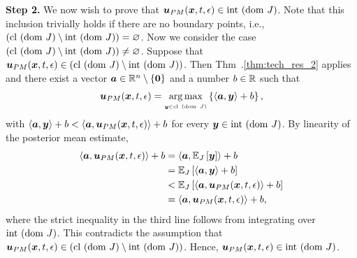 \textbf{Step 2.} We now wish to prove that $\boldsymbol{u}_{PM}(\boldsymbol{x},t,\epsilon) \in \mathrm{int~}(\mathrm{dom~} J)$. Note that this inclusion trivially holds if there are no boundary points, i.e., $
\left(\mathrm{cl~}(\mathrm{dom~} J) \setminus \mathrm{int~}(\mathrm{dom~} J)\right) = \varnothing$. Now we consider the case $\left(\mathrm{cl~}(\mathrm{dom~} J) \setminus \mathrm{int~}(\mathrm{dom~} J)\right) \neq \varnothing$. Suppose that $\boldsymbol{u}_{PM}(\boldsymbol{x},t,\epsilon) \in \left(\mathrm{cl~}(\mathrm{dom~} J) \setminus \mathrm{int~}(\mathrm{dom~} J)\right)$. Then Thm~.\ref{thm:tech_res_2} applies and there exist a vector $\boldsymbol{a}\in\mathbb{R}^n\setminus\{\boldsymbol{0}\}$ and a number $b\in\mathbb{R}$ such that 
\[
\boldsymbol{u}_{PM}(\boldsymbol{x},t,\epsilon)=\operatorname*{arg\,max}_{_{\boldsymbol{y}\in\mathrm{cl~}(\mathrm{dom~} J)}}\left\{\left\langle \boldsymbol{a},\boldsymbol{y}\right\rangle +b\right\},
\] 
with $\left\langle \boldsymbol{a},\boldsymbol{y}\right\rangle +b<\left\langle \boldsymbol{a},\boldsymbol{u}_{PM}(\boldsymbol{x},t,\epsilon)\right\rangle +b$ for every $\boldsymbol{y}\in\mathrm{int~}(\mathrm{dom~} J)$. By linearity of the posterior mean estimate,
\[
\begin{alignedat}{1}
\left\langle \boldsymbol{a},\boldsymbol{u}_{PM}(\boldsymbol{x},t,\epsilon)\right\rangle +b &= \left\langle \boldsymbol{a},\mathbb{E}_{J}\left [{\boldsymbol{y}}\right]\right\rangle +b\\
&= \mathbb{E}_{J}\left [{\left\langle \boldsymbol{a},\boldsymbol{y}\right\rangle +b}\right] \\
& < \mathbb{E}_{J}\left [{\left\langle \boldsymbol{a},\boldsymbol{u}_{PM}(\boldsymbol{x},t,\epsilon)\right\rangle +b}\right]\\
& =\left\langle \boldsymbol{a},\boldsymbol{u}_{PM}(\boldsymbol{x},t,\epsilon)\right\rangle +b,
\end{alignedat}
\]
where the strict inequality in the third line follows from integrating over $\mathrm{int~}(\mathrm{dom~} J)$. This contradicts the assumption that $\boldsymbol{u}_{PM}(\boldsymbol{x},t,\epsilon) \in \left(\mathrm{cl~}(\mathrm{dom~} J) \setminus \mathrm{int~}(\mathrm{dom~} J)\right)$. Hence, $\boldsymbol{u}_{PM}(\boldsymbol{x},t,\epsilon)\in\mathrm{int~}(\mathrm{dom~} J)$.


